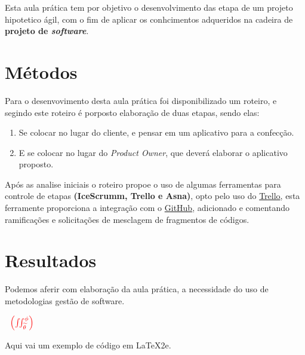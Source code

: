 \par Esta aula prática tem por objetivo o desenvolvimento das etapa de um projeto hipotetico ágil, com o fim de aplicar os conhcimentos adqueridos na cadeira de \textbf{projeto de \textit{software}}.

\section{Métodos}
\par Para o desenvovimento desta aula prática foi disponibilizado um roteiro, e segindo este roteiro é porposto elaboração de duas etapas, sendo elas:
\begin{enumerate}
  \item Se colocar no lugar do cliente, e pensar em um aplicativo para a confecção.
  \item E se colocar no lugar do \textit{Product Owner}, que deverá elaborar o aplicativo proposto.
\end{enumerate}

\par Após as analise iniciais o roteiro propoe o uso de algumas ferramentas para controle de etapas \textbf{(IceScrumm, Trello e Asna)}, opto pelo uso do \href {https://trello.com/home} {Trello}, esta ferramente proporciona a integração com o \href{www.github.com/}{GitHub}, adicionado e comentando ramificações e solicitações de mesclagem de fragmentos de códigos.

\section{Resultados}




\par Podemos aferir com elaboração da aula prática, a necessidade do uso de metodologias gestão de software.


$\underline{{\color{Blue} }}{\color{red} \, \: \: \left ( \iint_{\widetilde{ \theta }}^{\phi } \right )}  $



\par Aqui vai um exemplo de código em \LaTeX2e.


